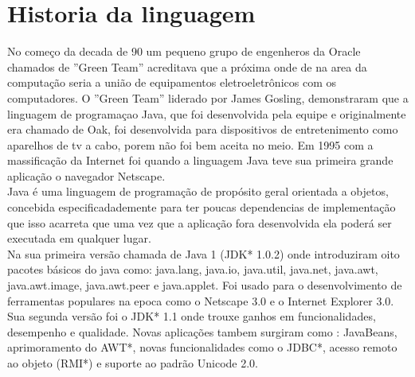 \section {Historia da linguagem}

No começo da decada de 90 um pequeno grupo de engenheros da Oracle chamados de ''Green Team'' acreditava que a próxima onde de na area da computação seria a união de equipamentos eletroeletrônicos com os computadores. O ''Green Team'' liderado por James Gosling, demonstraram que a linguagem de programaçao Java, que foi desenvolvida pela equipe e originalmente era chamado de Oak, foi desenvolvida para dispositivos de entretenimento como aparelhos de tv a cabo, porem não foi bem aceita no meio. Em 1995 com a massificação da Internet foi quando a linguagem Java teve sua primeira grande aplicação o navegador Netscape.\\

Java é uma linguagem de programação de propósito geral orientada a objetos, concebida especificadademente para ter poucas dependencias de implementação que isso acarreta que uma vez que a aplicação fora desenvolvida ela poderá ser executada em qualquer lugar.\\

Na sua primeira versão chamada de Java 1 (JDK* 1.0.2) onde introduziram oito pacotes básicos do java como: java.lang, java.io, java.util, java.net, java.awt, java.awt.image, java.awt.peer e java.applet. Foi usado para o desenvolvimento de ferramentas populares na epoca como o Netscape 3.0 e o Internet Explorer 3.0. \\

Sua segunda versão foi o JDK* 1.1 onde trouxe ganhos em funcionalidades, desempenho e qualidade. Novas aplicações tambem surgiram como : JavaBeans, aprimoramento do AWT*, novas funcionalidades como o JDBC*, acesso remoto ao objeto (RMI*) e suporte ao padrão Unicode 2.0.\\

